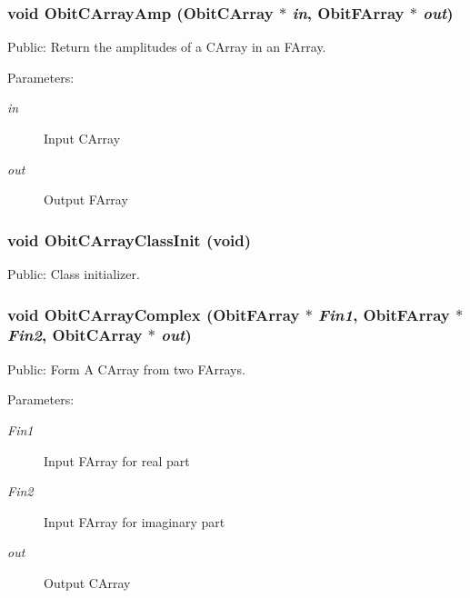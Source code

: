 \subsubsection{\setlength{\rightskip}{0pt plus 5cm}void Obit\-CArray\-Amp ({\bf Obit\-CArray} $\ast$ {\em in}, {\bf Obit\-FArray} $\ast$ {\em out})}\label{ObitCArray_8h_a66}


Public: Return the amplitudes of a CArray in an FArray. 

\begin{Desc}
\item[Parameters:]
\begin{description}
\item[{\em in}]Input CArray \item[{\em out}]Output FArray \end{description}
\end{Desc}
\subsubsection{\setlength{\rightskip}{0pt plus 5cm}void Obit\-CArray\-Class\-Init (void)}\label{ObitCArray_8h_a35}


Public: Class initializer. 

\subsubsection{\setlength{\rightskip}{0pt plus 5cm}void Obit\-CArray\-Complex ({\bf Obit\-FArray} $\ast$ {\em Fin1}, {\bf Obit\-FArray} $\ast$ {\em Fin2}, {\bf Obit\-CArray} $\ast$ {\em out})}\label{ObitCArray_8h_a63}


Public: Form A CArray from two FArrays. 

\begin{Desc}
\item[Parameters:]
\begin{description}
\item[{\em Fin1}]Input FArray for real part \item[{\em Fin2}]Input FArray for imaginary part \item[{\em out}]Output CArray \end{description}
\end{Desc}

